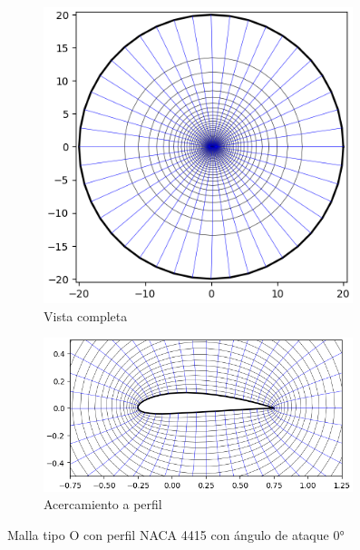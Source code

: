 \documentclass[letterpaper, openright, 12pt]{book}
\begin{document}
    \begin{figure}[htbp!]
        \centering
        \begin{subfigure}[c]{0.45\textwidth}
            \includegraphics[keepaspectratio,
                width=0.99\textwidth]{./img/naca4415_far}
            \caption{Vista completa}
            \label{fig:naca4415_far}
        \end{subfigure}
        \hfill
        \begin{subfigure}[c]{0.45\textwidth}
            \includegraphics[keepaspectratio,
                width=0.99\textwidth]{./img/naca4415_close}
            \caption{Acercamiento a perfil}
            \label{fig:naca4415_close}
        \end{subfigure}
        \caption[Malla tipo O con perfil NACA 4415]{Malla tipo O con perfil
            NACA 4415 con ángulo de ataque $0\si{\degree}$}
        \label{fig:naca4415}
    \end{figure}
\end{document}
